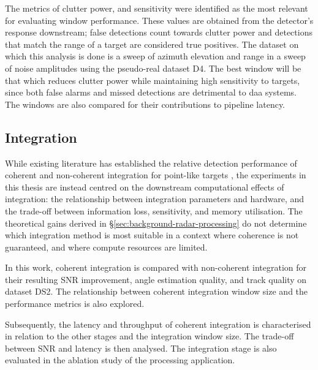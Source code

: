 The metrics of clutter power, and sensitivity were identified as the most relevant for evaluating 
window performance. These values are obtained from the detector's response downstream; false detections
count towards clutter power and detections that match the range of a target are considered true positives.
The dataset on which this analysis is done is a sweep of azimuth elevation and range in a sweep of noise 
amplitudes using the pseudo-real dataset D4. The best window will be that which reduces clutter power while 
maintaining 
high sensitivity to targets, since both false alarms and missed detections are detrimental to 
\gls{daa} systems. The windows are also compared for their contributions to pipeline latency. 


\subsection{Integration}
\label{sec:method-integration}
While existing literature has established the relative detection performance of
coherent and non-coherent integration for point-like targets
\cite{Richards2010}, the experiments in this thesis are instead centred on the
downstream computational effects of integration: the relationship between
integration parameters and hardware, and the trade-off between information loss,
sensitivity, and memory utilisation. The theoretical gains derived in
\S\ref{sec:background-radar-processing} do not determine which integration method 
is most suitable in a context where coherence is not guaranteed, and where 
compute resources are limited.   

In this work, coherent integration is compared with non-coherent integration for their 
resulting SNR 
improvement, angle estimation quality, and track quality on dataset DS2. 
The relationship between coherent integration window size and the performance metrics 
is also explored. 

Subsequently, the latency and throughput of coherent integration is characterised in relation to
the other stages and the integration window size. The trade-off between SNR and latency is then analysed. The integration stage is also evaluated in the
ablation study of the processing application. 